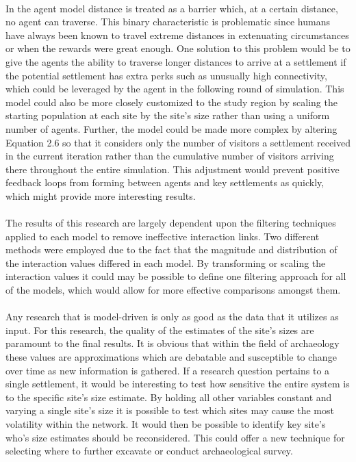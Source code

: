 \documentclass[12pt,a4paper]{thesis}
\begin{document}
\paragraph{}
In the agent model distance is treated as a barrier which, at a certain distance, no agent can traverse. This binary characteristic is problematic since humans have always been known to travel extreme distances in extenuating circumstances or when the rewards were great enough. One solution to this problem would be to give the agents the ability to traverse longer distances to arrive at a settlement if the potential settlement has extra perks such as unusually high connectivity, which could be leveraged by the agent in the following round of simulation. This model could also be more closely customized to the study region by scaling the starting population at each site by the site's size rather than using a uniform number of agents. Further, the model could be made more complex by altering Equation 2.6 so that it considers only the number of visitors a settlement received in the current iteration rather than the cumulative number of visitors arriving there throughout the entire simulation. This adjustment would prevent positive feedback loops from forming between agents and key settlements as quickly, which might provide more interesting results.

\paragraph{}
The results of this research are largely dependent upon the filtering techniques applied to each model to remove ineffective interaction links. Two different methods were employed due to the fact that the magnitude and distribution of the interaction values differed in each model. By transforming or scaling the interaction values it could may be possible to define one filtering approach for all of the models, which would allow for more effective comparisons amongst them.    

\paragraph{}
Any research that is model-driven is only as good as the data that it utilizes as input. For this research, the quality of the estimates of the site's sizes are paramount to the final results. It is obvious that within the field of archaeology these values are approximations which are debatable and susceptible to change over time as new information is gathered. If a research question pertains to a single settlement, it would be interesting to test how sensitive the entire system is to the specific site's size estimate. By holding all other variables constant and varying a single site's size it is possible to test which sites may cause the most volatility within the network. It would then be possible to identify key site's who's size estimates should be reconsidered. This could offer a new technique for selecting where to further excavate or conduct archaeological survey. 
\end{document}
